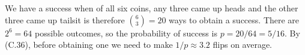 We have a success when of all six coins, any three came up heads and the other three came up tails\dash it is therefore $\binom{6}{3}=20$ ways to obtain a success.
There are $2^6=64$ possible outcomes, so the probability of success is $p=20/64=5/16$.
By (C.36), before obtaining one we need to make $1/p\approx3.2$ flips on average.
